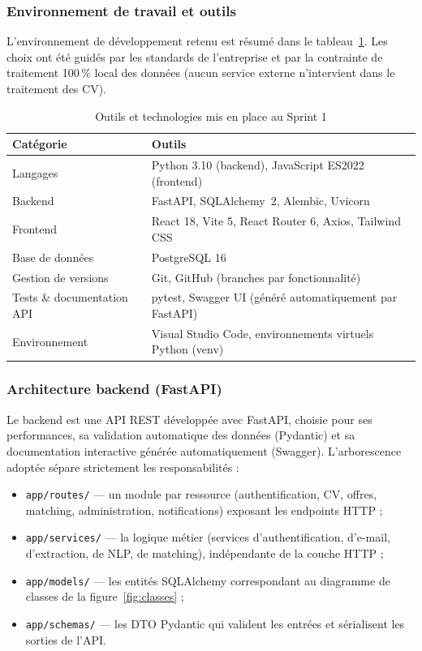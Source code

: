 \documentclass[12pt,a4paper]{report}
\begin{document}
\subsubsection{Environnement de travail et outils}

L'environnement de développement retenu est résumé dans le tableau~\ref{tab:outils-s1}. Les choix ont été guidés par les standards de l'entreprise et par la contrainte de traitement 100\,\% local des données (aucun service externe n'intervient dans le traitement des CV).

\begin{table}[H]
\centering
\caption{Outils et technologies mis en place au Sprint 1}
\label{tab:outils-s1}
\begin{tabularx}{\textwidth}{lX}
\toprule
\textbf{Catégorie} & \textbf{Outils} \\
\midrule
Langages & Python 3.10 (backend), JavaScript ES2022 (frontend) \\
Backend & FastAPI, SQLAlchemy~2, Alembic, Uvicorn \\
Frontend & React 18, Vite 5, React Router 6, Axios, Tailwind CSS \\
Base de données & PostgreSQL 16 \\
Gestion de versions & Git, GitHub (branches par fonctionnalité) \\
Tests \& documentation API & pytest, Swagger UI (généré automatiquement par FastAPI) \\
Environnement & Visual Studio Code, environnements virtuels Python (venv) \\
\bottomrule
\end{tabularx}
\end{table}

\subsubsection{Architecture backend (FastAPI)}

Le backend est une API REST développée avec FastAPI, choisie pour ses performances, sa validation automatique des données (Pydantic) et sa documentation interactive générée automatiquement (Swagger). L'arborescence adoptée sépare strictement les responsabilités :

\begin{itemize}
  \item \texttt{app/routes/} --- un module par ressource (authentification, CV, offres, matching, administration, notifications) exposant les endpoints HTTP ;
  \item \texttt{app/services/} --- la logique métier (services d'authentification, d'e-mail, d'extraction, de NLP, de matching), indépendante de la couche HTTP ;
  \item \texttt{app/models/} --- les entités SQLAlchemy correspondant au diagramme de classes de la figure~\ref{fig:classes} ;
  \item \texttt{app/schemas/} --- les DTO Pydantic qui valident les entrées et sérialisent les sorties de l'API.
\end{itemize}
\end{document}
